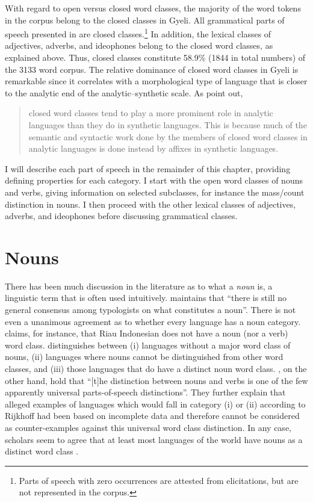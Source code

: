 With regard to open versus closed word classes, the majority of the word tokens in the corpus belong to the closed classes in Gyeli. All grammatical parts of speech  presented in 
are closed classes.\footnote{Parts of speech with zero occurrences are attested from elicitations, but are not represented in the corpus.} In addition, the lexical classes of adjectives, adverbs, and ideophones belong to the closed word classes, as explained above. Thus, closed classes constitute 58.9\% (1844 in total numbers) of the 3133 word corpus.
The relative dominance of closed word classes in Gyeli is remarkable since it correlates with a morphological type of language that is closer to the analytic end of the analytic--synthetic scale. As \citet[23]{schachter2007} point out,
\begin{quote} closed word classes tend to play a more prominent role in analytic languages than they do in synthetic languages. This is because much of the semantic and syntactic work done by the members of closed word classes in analytic languages is done instead by affixes in synthetic languages.
\end{quote} 


I will describe each part of speech in the remainder of this chapter, providing defining properties for each category. I start with the open word classes of nouns and verbs, giving information on selected subclasses, for instance the mass/count distinction in nouns. I then proceed with the other lexical classes of adjectives, adverbs, and ideophones before discussing grammatical classes.







	
	

\section{Nouns}
\label{sec:N}


There has been much discussion in the literature as to what a {\itshape noun} is, a linguistic term that is often used intuitively. \citet[10]{rijkhoff2002} maintains that ``there is still no general consensus among typologists on what constitutes a noun''. There is not even a unanimous agreement as to whether every language has a noun category. \citet{gil2013} claims, for instance, that Riau Indonesian does not have a noun (nor a verb) word class. \citet[12]{rijkhoff2002} distinguishes between (i) languages without a major word class of nouns, (ii) languages where nouns cannot be distinguished from other word classes, and (iii) those languages that do have a distinct noun word class. \citet[5]{schachter2007}, on the other hand, hold that ``[t]he distinction between nouns and verbs is one of the few apparently universal parts-of-speech distinctions''. They further explain that alleged examples of languages which would fall in category (i) or (ii) according to Rijkhoff had been based on incomplete data and therefore cannot be considered as counter-examples against this universal word class distinction. In any case, scholars seem to agree that at least most languages of the world have nouns as a distinct word class \citep[720]{tamm2006}. 

